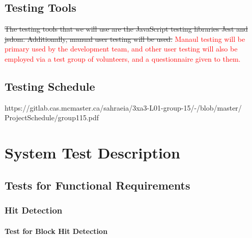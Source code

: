 \documentclass[12pt, titlepage]{article}
\begin{document}
\subsection{Testing Tools}
\sout{The testing tools that we will use are the JavaScript testing libraries Jest and jsdom. Additionally, manual user testing will be used.} \textcolor{red}{Manaul testing will be primary used by the development team, and other user testing will also be employed via a test group of volunteers, and a questionnaire given to them.}

\subsection{Testing Schedule}

https://gitlab.cas.mcmaster.ca/sahraeia/3xa3-L01-group-15/-/blob/master/\\ProjectSchedule/group115.pdf

\section{System Test Description}
	
\subsection{Tests for Functional Requirements}

\subsubsection{Hit Detection}
		
\paragraph{Test for Block Hit Detection}
\end{document}
